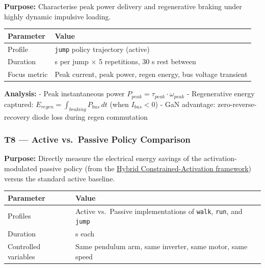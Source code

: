 \documentclass[
]{article}
\newcounter{none} %
\begin{document}
\textbf{Purpose:} Characterise peak power delivery and regenerative
braking under highly dynamic impulsive loading.

{\def\LTcaptype{none} %
\begin{longtable}[]{@{}
  >{\raggedright\arraybackslash}p{}
  >{\raggedright\arraybackslash}p{}@{}}
\toprule\noalign{}
\begin{minipage}[b]{\linewidth}\raggedright
Parameter
\end{minipage} & \begin{minipage}[b]{\linewidth}\raggedright
Value
\end{minipage} \\
\midrule\noalign{}
\endhead
\bottomrule\noalign{}
\endlastfoot
Profile & \texttt{jump} policy trajectory (active) \\
Duration & 2 s per jump × 5 repetitions, 30 s rest between \\
Focus metric & Peak current, peak power, regen energy, bus voltage
transient \\
\end{longtable}
}

\textbf{Analysis:} - Peak instantaneous power
\(P_{peak} = \tau_{peak} \cdot \omega_{peak}\) - Regenerative energy
captured: \(E_{regen} = \int_{braking} P_{bus} \, dt\) (when
\(I_{bus} < 0\)) - GaN advantage: zero-reverse-recovery diode loss
during regen commutation

\subsubsection{T8 --- Active vs.~Passive Policy
Comparison}\label{t8-active-vs.-passive-policy-comparison}

\textbf{Purpose:} Directly measure the electrical energy savings of the
activation-modulated passive policy (from the
\href{../../MuJoCo/docs/passive_policy_research.md}{Hybrid
Constrained-Activation framework}) versus the standard active baseline.

{\def\LTcaptype{none} %
\begin{longtable}[]{@{}
  >{\raggedright\arraybackslash}p{}
  >{\raggedright\arraybackslash}p{}@{}}
\toprule\noalign{}
\begin{minipage}[b]{\linewidth}\raggedright
Parameter
\end{minipage} & \begin{minipage}[b]{\linewidth}\raggedright
Value
\end{minipage} \\
\midrule\noalign{}
\endhead
\bottomrule\noalign{}
\endlastfoot
Profiles & Active vs.~Passive implementations of \texttt{walk},
\texttt{run}, and \texttt{jump} \\
Duration & 60 s each \\
Controlled variables & Same pendulum arm, same inverter, same motor,
same speed \\
\end{longtable}
}
\end{document}

